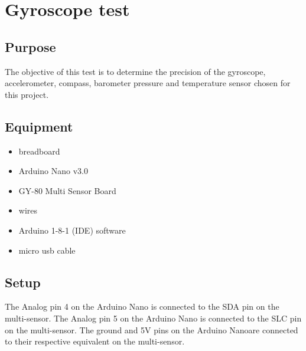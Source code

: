 		\chapter{Gyroscope test}

	\section{Purpose}

The objective of this test is to determine the precision of the gyroscope, accelerometer, compass, barometer pressure and temperature sensor chosen for this project.

	\section{Equipment}
	
\begin{itemize}
	\item breadboard
	\item Arduino Nano v3.0
	\item GY-80  Multi Sensor Board
	\item wires
	\item Arduino 1-8-1 (IDE) software
	\item micro usb cable
\end{itemize}

	\section{Setup}

The Analog pin 4 on the Arduino Nano is connected to the SDA pin on the multi-sensor. The Analog pin 5 on the Arduino Nano is connected to the SLC pin on the multi-sensor. The ground and 5V pins on the Arduino Nanoare connected to their respective equivalent on the multi-sensor.

